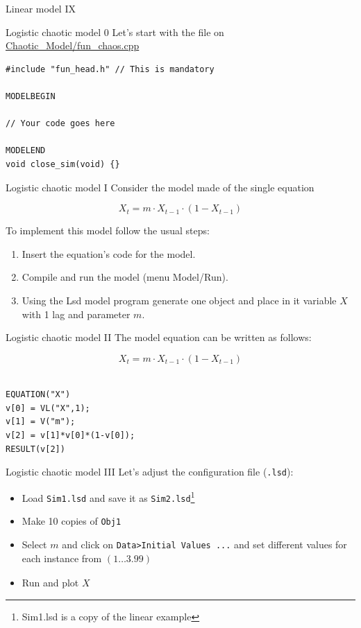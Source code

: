 \documentclass[bigger,aspectratio=169]{beamer}
\begin{document}
\begin{frame}[label={sec:org8be347a}]{Linear model IX}
\begin{center}

\end{center}
\end{frame}
\begin{frame}[label={sec:orgce7ee04},fragile]{Logistic chaotic model 0}
 Let's start with the file on \url{Chaotic\_Model/fun\_chaos.cpp}


\begin{verbatim}
#include "fun_head.h" // This is mandatory

MODELBEGIN

// Your code goes here

MODELEND
void close_sim(void) {}
\end{verbatim}
\end{frame}
\begin{frame}[label={sec:orgd579d94}]{Logistic chaotic model I}
Consider the model made of the single equation

\[X_{t} = m\cdot X_{t-1}\cdot (1 - X_{t-1})\]

To implement this model follow the usual steps:
\begin{enumerate}
\item Insert the equation’s code for the model.
\item Compile and run the model (menu \alert{Model/Run}).
\item Using the Lsd model program generate one object and place in it variable \(X\) with 1 lag and parameter \(m\).
\end{enumerate}
\end{frame}
\begin{frame}[label={sec:org6c37b49},fragile]{Logistic chaotic model II}
 The model equation can be written as follows:

\[X_{t} = m\cdot X_{t-1}\cdot (1 - X_{t-1})\]

\begin{verbatim}

EQUATION("X")
v[0] = VL("X",1);
v[1] = V("m");
v[2] = v[1]*v[0]*(1-v[0]);
RESULT(v[2])
\end{verbatim}
\end{frame}
\begin{frame}[label={sec:orgffee4af},fragile]{Logistic chaotic model III}
 Let's adjust the configuration file (\texttt{.lsd}):

\begin{itemize}
\item Load \texttt{Sim1.lsd} and save it as \texttt{Sim2.lsd}\footnote{Sim1.lsd is a copy of the linear example}
\item Make \alert{10} copies of \texttt{Obj1}
\item Select \(m\) and click on \texttt{Data>Initial Values ...} and set different values for each instance from \((1 \ldots 3.99)_{}\)
\item Run and plot \(X\)
\end{itemize}
\end{frame}
\end{document}

